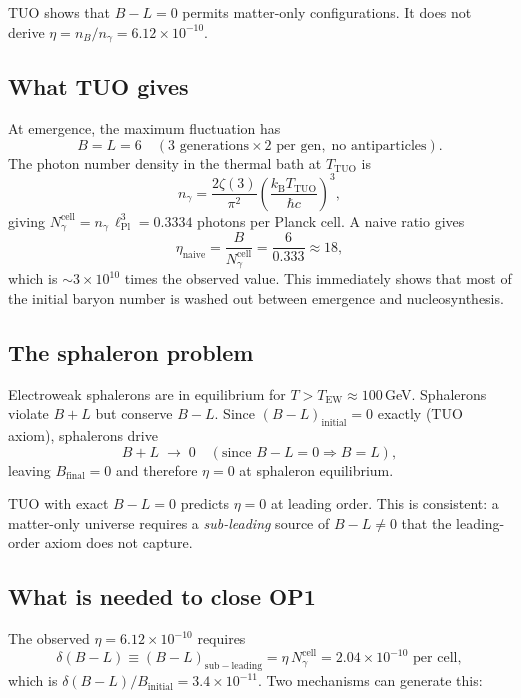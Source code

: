 \documentclass[12pt,a4paper]{article}
\theoremstyle{remark}
\newcommand{\lPl}{\ell_{\mathrm{Pl}}}
\newcommand{\kB}{k_{\mathrm{B}}}
\newcommand{\TTUO}{T_{\mathrm{TUO}}}
\begin{document}
\begin{tcolorbox}[opbox,title={Open Problem 1}]
TUO shows that $B-L=0$ permits matter-only configurations.
It does not derive $\eta = n_B/n_\gamma = 6.12\times10^{-10}$.
\end{tcolorbox}

\subsection{What TUO gives}

At emergence, the maximum fluctuation has
\[
  B = L = 6 \quad (3\text{ generations}\times 2\text{ per gen},\;\text{no antiparticles}).
\]
The photon number density in the thermal bath at $\TTUO$ is
\[
  n_\gamma = \frac{2\zeta(3)}{\pi^2}\!\left(\frac{\kB\TTUO}{\hbar c}\right)^3,
\]
giving $N_\gamma^\mathrm{cell} = n_\gamma\,\lPl^3 = 0.3334$ photons per Planck cell.
A naive ratio gives
\[
  \eta_\mathrm{naive} = \frac{B}{N_\gamma^\mathrm{cell}} = \frac{6}{0.333} \approx 18,
\]
which is $\sim3\times10^{10}$ times the observed value.
This immediately shows that most of the initial baryon number is washed
out between emergence and nucleosynthesis.

\subsection{The sphaleron problem}

Electroweak sphalerons are in equilibrium for $T > T_\mathrm{EW} \approx 100$\,GeV.
Sphalerons violate $B+L$ but conserve $B-L$.
Since $(B-L)_\mathrm{initial} = 0$ exactly (TUO axiom), sphalerons drive
\[
  B + L \;\to\; 0 \quad (\text{since } B-L = 0 \Rightarrow B = L),
\]
leaving $B_\mathrm{final} = 0$ and therefore $\eta = 0$ at sphaleron equilibrium.

\begin{tcolorbox}[findingbox,title={Finding}]
TUO with exact $B-L = 0$ predicts $\eta = 0$ at leading order.
This is consistent: a matter-only universe requires a \emph{sub-leading}
source of $B-L \neq 0$ that the leading-order axiom does not capture.
\end{tcolorbox}

\subsection{What is needed to close OP1}

The observed $\eta = 6.12\times10^{-10}$ requires
\[
  \delta(B-L) \equiv (B-L)_\mathrm{sub-leading} = \eta\,N_\gamma^\mathrm{cell}
  = 2.04\times10^{-10} \text{ per cell},
\]
which is $\delta(B-L)/B_\mathrm{initial} = 3.4\times10^{-11}$.
Two mechanisms can generate this:
\end{document}
